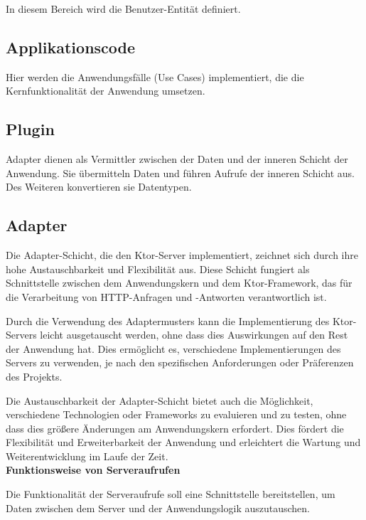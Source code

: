 In diesem Bereich wird die Benutzer-Entität definiert. 

\subsection{Applikationscode}

Hier werden die Anwendungsfälle (Use Cases) implementiert, die die Kernfunktionalität der Anwendung umsetzen.


\subsection{Plugin}

Adapter dienen als Vermittler zwischen der Daten und der inneren Schicht der Anwendung. Sie übermitteln Daten und führen Aufrufe der inneren Schicht aus. Des Weiteren konvertieren sie Datentypen.



\subsection{Adapter}

Die Adapter-Schicht, die den Ktor-Server implementiert, zeichnet sich durch ihre hohe Austauschbarkeit und Flexibilität aus. Diese Schicht fungiert als Schnittstelle zwischen dem Anwendungskern und dem Ktor-Framework, das für die Verarbeitung von HTTP-Anfragen und -Antworten verantwortlich ist.

Durch die Verwendung des Adaptermusters kann die Implementierung des Ktor-Servers leicht ausgetauscht werden, ohne dass dies Auswirkungen auf den Rest der Anwendung hat. Dies ermöglicht es, verschiedene Implementierungen des Servers zu verwenden, je nach den spezifischen Anforderungen oder Präferenzen des Projekts.

Die Austauschbarkeit der Adapter-Schicht bietet auch die Möglichkeit, verschiedene Technologien oder Frameworks zu evaluieren und zu testen, ohne dass dies größere Änderungen am Anwendungskern erfordert. Dies fördert die Flexibilität und Erweiterbarkeit der Anwendung und erleichtert die Wartung und Weiterentwicklung im Laufe der Zeit.\\

\textbf{Funktionsweise von Serveraufrufen}

Die Funktionalität der Serveraufrufe soll eine Schnittstelle bereitstellen, um Daten zwischen dem Server und der Anwendungslogik auszutauschen.



